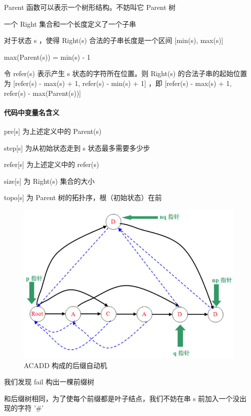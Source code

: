 \documentclass{article}
\begin{document}
Parent 函数可以表示一个树形结构。不妨叫它 Parent 树

一个 Right 集合和一个长度定义了一个子串

对于状态 s ，使得 Right(s) 合法的子串长度是一个区间 [min(s), max(s)]

max(Parent(s)) = min(s) - 1

令 refer(s) 表示产生 s 状态的字符所在位置。则 Right(s) 的合法子串的起始位置为 [refer(s) - max(s) + 1, refer(s) - min(s) + 1] ，即 [refer(s) - max(s) + 1, refer(s) - max(Parent(s))]

\paragraph{代码中变量名含义}

pre[s] 为上述定义中的 Parent(s)

step[s] 为从初始状态走到 s 状态最多需要多少步

refer[s] 为上述定义中的 refer(s)

size[s] 为 Right(s) 集合的大小

topo[s] 为 Parent 树的拓扑序，根（初始状态）在前

\begin{figure}[htbp]
  \centering
  \includegraphics[scale=0.6]{suffix_auto.jpg}
  \caption{ACADD 构成的后缀自动机}
  \label{suffix_auto}
\end{figure}

我们发现 fail 构出一棵前缀树

和后缀树相同，为了使每个前缀都是叶子结点，我们不妨在串 s 前加入一个没出现的字符 '\#'
\end{document}
